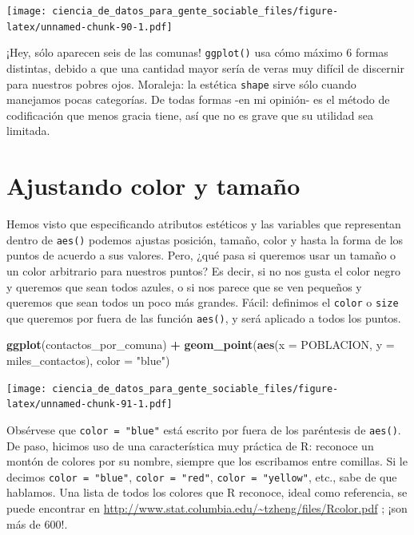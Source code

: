 \documentclass[spanish,]{book}
\newenvironment{Shaded}{\begin{snugshade}}{\end{snugshade}}
\newcommand{\DataTypeTok}[1]{\textcolor[rgb]{0.13,0.29,0.53}{#1}}
\newcommand{\KeywordTok}[1]{\textcolor[rgb]{0.13,0.29,0.53}{\textbf{#1}}}
\newcommand{\NormalTok}[1]{#1}
\newcommand{\OperatorTok}[1]{\textcolor[rgb]{0.81,0.36,0.00}{\textbf{#1}}}
\newcommand{\StringTok}[1]{\textcolor[rgb]{0.31,0.60,0.02}{#1}}
\begin{document}
\texttt{[image: ciencia\_de\_datos\_para\_gente\_sociable\_files/figure-latex/unnamed-chunk-90-1.pdf]}

¡Hey, sólo aparecen seis de las comunas! \texttt{ggplot()} usa cómo máximo 6 formas distintas, debido a que una cantidad mayor sería de veras muy difícil de discernir para nuestros pobres ojos. Moraleja: la estética \texttt{shape} sirve sólo cuando manejamos pocas categorías. De todas formas -en mi opinión- es el método de codificación que menos gracia tiene, así que no es grave que su utilidad sea limitada.

\hypertarget{ajustando-color-y-tamano}{%
\section{Ajustando color y tamaño}\label{ajustando-color-y-tamano}}

Hemos visto que especificando atributos estéticos y las variables que representan dentro
de \texttt{aes()} podemos ajustas posición, tamaño, color y hasta la forma de los puntos de acuerdo a sus valores. Pero, ¿qué pasa si queremos usar un tamaño o un color arbitrario para nuestros puntos? Es decir, si no nos gusta el color negro y queremos que sean todos azules, o si nos parece que se ven pequeños y queremos que sean todos un poco más grandes. Fácil: definimos el \texttt{color} o \texttt{size} que queremos por fuera de las función \texttt{aes()}, y será aplicado a todos los puntos.

\begin{Shaded}
\begin{Highlighting}[]
\KeywordTok{ggplot}\NormalTok{(contactos_por_comuna) }\OperatorTok{+}\StringTok{ }
\StringTok{    }\KeywordTok{geom_point}\NormalTok{(}\KeywordTok{aes}\NormalTok{(}\DataTypeTok{x =}\NormalTok{ POBLACION, }\DataTypeTok{y =}\NormalTok{ miles_contactos), }\DataTypeTok{color =} \StringTok{"blue"}\NormalTok{)}
\end{Highlighting}
\end{Shaded}

\texttt{[image: ciencia\_de\_datos\_para\_gente\_sociable\_files/figure-latex/unnamed-chunk-91-1.pdf]}

Obsérvese que \texttt{color\ =\ "blue"} está escrito por fuera de los paréntesis de \texttt{aes()}. De paso, hicimos uso de una característica muy práctica de R: reconoce un montón de colores por su nombre, siempre que los escribamos entre comillas. Si le decimos \texttt{color\ =\ "blue"}, \texttt{color\ =\ "red"}, \texttt{color\ =\ "yellow"}, etc., sabe de que hablamos. Una lista de todos los colores que R reconoce, ideal como referencia, se puede encontrar en \url{http://www.stat.columbia.edu/~tzheng/files/Rcolor.pdf} ; ¡son más de 600!.
\end{document}
